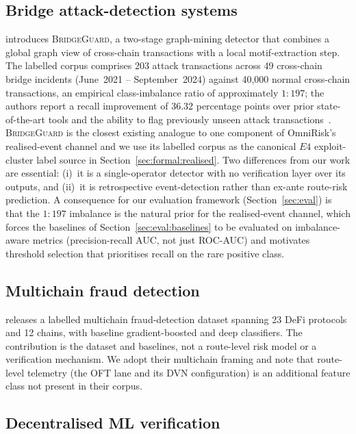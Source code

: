 \documentclass[11pt,a4paper]{article}
\begin{document}
\subsection{Bridge attack-detection systems}\label{sec:related:bridge-detection}

\cite{wu2025safeguarding} introduces \textsc{BridgeGuard}, a two-stage graph-mining
detector that combines a global graph view of cross-chain transactions with a local
motif-extraction step. The labelled corpus comprises 203 attack transactions across
49 cross-chain bridge incidents (June~2021 -- September~2024) against 40{,}000 normal
cross-chain transactions, an empirical class-imbalance ratio of approximately
$1{:}197$; the authors report a recall improvement of 36.32 percentage points over
prior state-of-the-art tools and the ability to flag previously unseen attack
transactions~\cite{wu2025safeguarding}. \textsc{BridgeGuard} is the closest existing
analogue to one component of OmniRisk's realised-event channel and we use its labelled
corpus as the canonical $E4$ exploit-cluster label source in
Section~\ref{sec:formal:realised}. Two differences from our work are essential:
(i)~it is a single-operator detector with no verification layer over its outputs, and
(ii)~it is retrospective event-detection rather than ex-ante route-risk prediction.
A consequence for our evaluation framework (Section~\ref{sec:eval}) is that the
$1{:}197$ imbalance is the natural prior for the realised-event channel, which forces
the baselines of Section~\ref{sec:eval:baselines} to be evaluated on imbalance-aware
metrics (precision-recall AUC, not just ROC-AUC) and motivates threshold selection
that prioritises recall on the rare positive class.

\subsection{Multichain fraud detection}\label{sec:related:multichain}

\cite{palaiokrassas2023multichain} releases a labelled multichain fraud-detection dataset
spanning 23 DeFi protocols and 12 chains, with baseline gradient-boosted and deep
classifiers. The contribution is the dataset and baselines, not a route-level risk model
or a verification mechanism. We adopt their multichain framing and note that route-level
telemetry (the OFT lane and its DVN configuration) is an additional feature class not
present in their corpus.

\subsection{Decentralised ML verification}\label{sec:related:dml}
\end{document}
